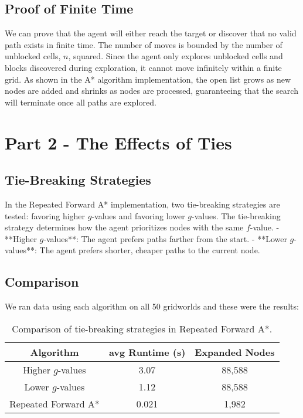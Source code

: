 \documentclass[12pt]{article}
\begin{document}
\subsection*{Proof of Finite Time}
We can prove that the agent will either reach the target or discover that no valid path exists in finite time. The number of moves is bounded by the number of unblocked cells, $n$, squared. Since the agent only explores unblocked cells and blocks discovered during exploration, it cannot move infinitely within a finite grid. As shown in the A* algorithm implementation, the open list grows as new nodes are added and shrinks as nodes are processed, guaranteeing that the search will terminate once all paths are explored.

\section*{Part 2 - The Effects of Ties}

\subsection*{Tie-Breaking Strategies}
In the Repeated Forward A* implementation, two tie-breaking strategies are tested: favoring higher $g$-values and favoring lower $g$-values. The tie-breaking strategy determines how the agent prioritizes nodes with the same $f$-value. 
- **Higher $g$-values**: The agent prefers paths farther from the start.
- **Lower $g$-values**: The agent prefers shorter, cheaper paths to the current node.

\subsection*{Comparison}
We ran data using each algorithm on all 50 gridworlds and these were the results:

\begin{table}[H]
\centering
\begin{tabular}{|c|c|c|}
\hline
\textbf{Algorithm} & \textbf{avg Runtime (s)} & \textbf{Expanded Nodes} \\
\hline
Higher $g$-values & 3.07 & 88,588 \\
Lower $g$-values & 1.12  & 88,588 \\
Repeated Forward A* & 0.021 & 1,982 \\
\hline
\end{tabular}
\caption{Comparison of tie-breaking strategies in Repeated Forward A*.}
\end{table}
\end{document}
